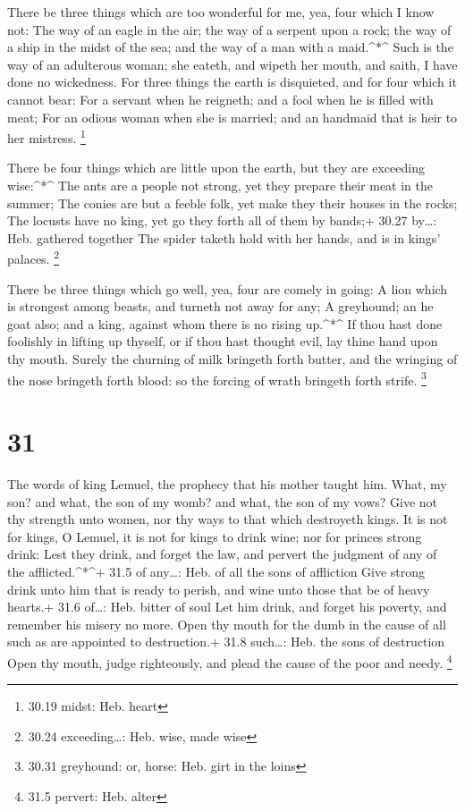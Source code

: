  There be three things which are too wonderful for me, yea,
four which I know not:  The way of an eagle in the air; the
way of a serpent upon a rock; the way of a ship in the midst of the sea;
and the way of a man with a maid.\^{}*\^{}  Such is the way
of an adulterous woman; she eateth, and wipeth her mouth, and saith, I
have done no wickedness.  For three things the earth is
disquieted, and for four which it cannot bear:  For a
servant when he reigneth; and a fool when he is filled with meat;
 For an odious woman when she is married; and an handmaid
that is heir to her mistress. \footnote{30.19 midst: Heb. heart}

 There be four things which are little upon the earth, but
they are exceeding wise:\^{}*\^{}  The ants are a people
not strong, yet they prepare their meat in the summer;  The
conies are but a feeble folk, yet make they their houses in the rocks;
 The locusts have no king, yet go they forth all of them by
bands;+ 30.27 by\ldots: Heb. gathered together  The spider
taketh hold with her hands, and is in kings' palaces. \footnote{30.24
  exceeding\ldots: Heb. wise, made wise}

 There be three things which go well, yea, four are comely
in going:  A lion which is strongest among beasts, and
turneth not away for any;  A greyhound; an he goat also;
and a king, against whom there is no rising up.\^{}*\^{} 
If thou hast done foolishly in lifting up thyself, or if thou hast
thought evil, lay thine hand upon thy mouth.  Surely the
churning of milk bringeth forth butter, and the wringing of the nose
bringeth forth blood: so the forcing of wrath bringeth forth strife.
\footnote{30.31 greyhound: or, horse: Heb. girt in the loins}

\hypertarget{section-30}{%
\section{31}\label{section-30}}

 The words of king Lemuel, the prophecy that his mother
taught him.  What, my son? and what, the son of my womb? and
what, the son of my vows?  Give not thy strength unto women,
nor thy ways to that which destroyeth kings.  It is not for
kings, O Lemuel, it is not for kings to drink wine; nor for princes
strong drink:  Lest they drink, and forget the law, and
pervert the judgment of any of the afflicted.\^{}*\^{}+ 31.5 of
any\ldots: Heb. of all the sons of affliction  Give strong
drink unto him that is ready to perish, and wine unto those that be of
heavy hearts.+ 31.6 of\ldots: Heb. bitter of soul  Let him
drink, and forget his poverty, and remember his misery no more.
 Open thy mouth for the dumb in the cause of all such as are
appointed to destruction.+ 31.8 such\ldots: Heb. the sons of destruction
 Open thy mouth, judge righteously, and plead the cause of
the poor and needy. \footnote{31.5 pervert: Heb. alter}

